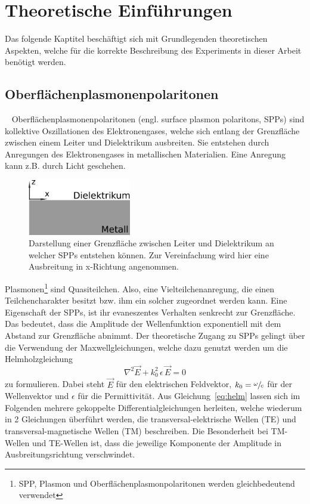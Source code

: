 \chapter{Theoretische Einführungen}
Das folgende Kaptitel beschäftigt sich mit Grundlegenden theoretischen 
Aspekten, welche für die korrekte Beschreibung des Experiments in dieser
Arbeit benötigt werden.
\section{Oberflächenplasmonenpolaritonen}~\label{sec:spps}
Oberflächenplasmonenpolaritonen (engl. surface plasmon polaritons, SPPs)
sind kollektive Oszillationen des Elektronengases, welche sich entlang der Grenzfläche
zwischen einem Leiter und Dielektrikum ausbreiten.\cite{plasmonics}
Sie entstehen durch Anregungen des Elektronengases in metallischen Materialien.
Eine Anregung kann z.B. durch Licht geschehen.

\begin{figure}
    \includegraphics[width=4.5cm]{./Plots/leiter_und_nichtleiter.pdf}
    \caption{Darstellung einer Grenzfläche zwischen Leiter und Dielektrikum an welcher 
    SPPs entstehen können. Zur Vereinfachung wird hier eine Ausbreitung in x-Richtung angenommen.\\}
    \label{fig:kasten}
\end{figure}
\FloatBarrier

Plasmonen\footnote{SPP, Plasmon und Oberflächenplasmonpolaritonen werden gleichbedeutend verwendet} sind Quasiteilchen. 
Also, eine Vielteilchenanregung, die einen Teilchencharakter besitzt bzw. ihm ein solcher zugeordnet werden kann. 
Eine Eigenschaft der SPPs, 
ist ihr evaneszentes Verhalten senkrecht zur Grenzfläche. Das bedeutet, 
dass die Amplitude der Wellenfunktion
exponentiell mit dem Abstand zur Grenzfläche abnimmt.
Der theoretische Zugang zu SPPs gelingt über die Verwendung der Maxwellgleichungen, welche dazu
genutzt werden um die Helmholzgleichung 
\begin{equation}
    \nabla^2 \vec{E} + k^2_0 \, \epsilon \, \vec{E} = 0
    \label{eq:helm}
\end{equation}
zu formulieren.\cite{plasmonics} 
Dabei steht $\vec{E}$ für den elektrischen Feldvektor, $k_0 = \sfrac{\omega}{c}$ 
für der Wellenvektor und $\epsilon$ für die Permittivität.
Aus Gleichung~\ref{eq:helm} lassen sich im Folgenden mehrere gekoppelte Differentialgleichungen
herleiten, welche wiederum in 2 Gleichungen überführt werden, die transversal-elektrische Wellen (TE) und 
transversal-magnetische Wellen (TM) beschreiben.
Die Besonderheit bei TM-Wellen und TE-Wellen ist, dass 
die jeweilige Komponente der Amplitude in Ausbreitungsrichtung verschwindet.

